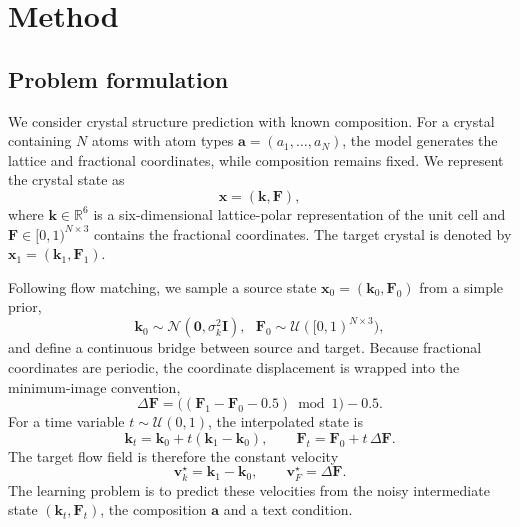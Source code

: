 \documentclass[fleqn,10pt]{wlscirep}
\begin{document}
\section*{Method}
\subsection*{Problem formulation}
We consider crystal structure prediction with known composition. For a crystal containing $N$ atoms with atom types $\mathbf{a} = (a_1,\dots,a_N)$, the model generates the lattice and fractional coordinates, while composition remains fixed. We represent the crystal state as
\begin{equation}
\mathbf{x} = (\mathbf{k}, \mathbf{F}),
\end{equation}
where $\mathbf{k} \in \mathbb{R}^{6}$ is a six-dimensional lattice-polar representation of the unit cell and $\mathbf{F} \in [0,1)^{N \times 3}$ contains the fractional coordinates. The target crystal is denoted by $\mathbf{x}_1 = (\mathbf{k}_1, \mathbf{F}_1)$.

Following flow matching, we sample a source state $\mathbf{x}_0 = (\mathbf{k}_0, \mathbf{F}_0)$ from a simple prior,
\begin{equation}
\mathbf{k}_0 \sim \mathcal{N}(\mathbf{0}, \sigma_k^2 \mathbf{I}), \,\,\,\,
\mathbf{F}_0 \sim \mathcal{U}([0,1)^{N \times 3}),
\end{equation}
and define a continuous bridge between source and target. Because fractional coordinates are periodic, the coordinate displacement is wrapped into the minimum-image convention,
\begin{equation}
\Delta \mathbf{F} = \big((\mathbf{F}_1 - \mathbf{F}_0 - 0.5) \bmod 1\big) - 0.5.
\end{equation}
For a time variable $t \sim \mathcal{U}(0,1)$, the interpolated state is
\begin{equation}
\mathbf{k}_t = \mathbf{k}_0 + t(\mathbf{k}_1 - \mathbf{k}_0),
\qquad
\mathbf{F}_t = \mathbf{F}_0 + t\, \Delta \mathbf{F}.
\end{equation}
The target flow field is therefore the constant velocity
\begin{equation}
\mathbf{v}_{k}^{\star} = \mathbf{k}_1 - \mathbf{k}_0,
\qquad
\mathbf{v}_{F}^{\star} = \Delta \mathbf{F}.
\end{equation}
The learning problem is to predict these velocities from the noisy intermediate state $(\mathbf{k}_t, \mathbf{F}_t)$, the composition $\mathbf{a}$ and a text condition.
\end{document}
